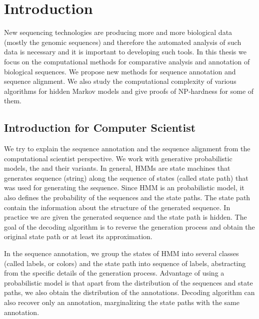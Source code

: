 \chapter{Introduction}

New sequencing technologies are producing more and more biological data (mostly
the genomic sequences) and therefore the automated analysis of such data is
necessary and it is important to developing such tools. In this thesis we focus
on the computational methods for comparative analysis and annotation of
biological sequences. We propose new methods for sequence annotation and
sequence alignment. We also study the computational complexity of various
algorithms for hidden Markov models and give proofs of NP-hardness for some of
them.

\section{Introduction for Computer Scientist}

We try to explain the sequence annotation and the sequence alignment from the
computational scientist perspective. We work with generative probabilistic
models, the  and their variants. In
general, HMMs are state machines that generates sequence (string) along the
sequence of states (called state path) that was used for generating the
sequence. Since HMM is an probabilistic model, it also defines the probability
of the sequences and the state paths. The state path contain the information
about the structure of the generated sequence. In practice we are given the
generated sequence and the state path is hidden. The goal of the decoding
algorithm is to reverse the generation process and obtain the original state
path or at least its approximation.

In the sequence annotation, we group the states of HMM into several classes
(called labels, or colors) and the state path into sequence of labels,
abstracting from the specific details of the generation process.  Advantage of
using a probabilistic model is that apart from the distribution of the
sequences and state paths, we also obtain the distribution of the annotations.
Decoding algorithm can also recover only an annotation, marginalizing the state
paths with the same annotation.


